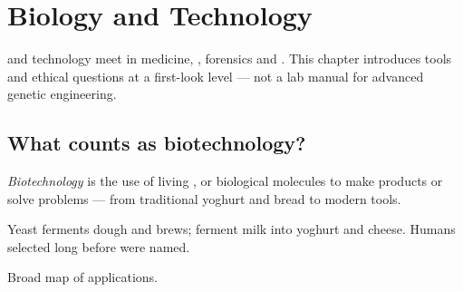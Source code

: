 \chapter{Biology and Technology}\label{ch:g9:biotech}

 and technology meet in medicine, , forensics and
. This chapter introduces tools and ethical questions at a
first-look level --- not a lab manual for advanced genetic engineering.

\section{What counts as biotechnology?}

\begin{definition}[Biotechnology]\label{def:g9:biotech:def}
\emph{Biotechnology} is the use of living ,
 or biological molecules to make products or solve problems --- from
traditional yoghurt and bread to modern  tools.
\end{definition}

\begin{example}\label{ex:g9:biotech:trad}
Yeast ferments dough and brews;  ferment milk into yoghurt and
cheese. Humans selected  long before  were named.
\end{example}

\begin{omfigure}

{\small Broad map of applications.}
\end{omfigure}

